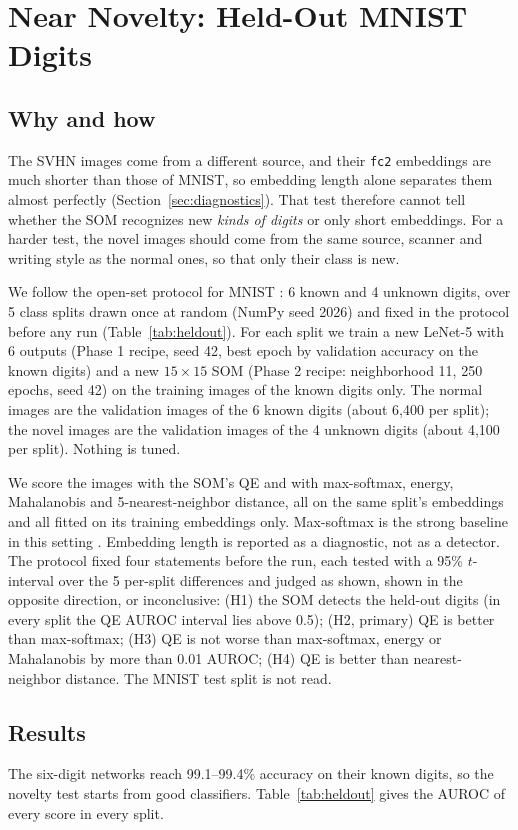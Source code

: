 \documentclass[11pt]{article}
\begin{document}
\section{Near Novelty: Held-Out MNIST Digits}\label{sec:heldout}
\subsection{Why and how}
The SVHN images come from a different source, and their \texttt{fc2} embeddings are much shorter than those of MNIST, so embedding length alone separates them almost perfectly (Section~\ref{sec:diagnostics}). That test therefore cannot tell whether the SOM recognizes new \emph{kinds of digits} or only short embeddings. For a harder test, the novel images should come from the same source, scanner and writing style as the normal ones, so that only their class is new.

We follow the open-set protocol for MNIST \parencite{neal2018open}: 6 known and 4 unknown digits, over 5 class splits drawn once at random (NumPy seed 2026) and fixed in the protocol before any run (Table~\ref{tab:heldout}). For each split we train a new LeNet-5 with 6 outputs (Phase 1 recipe, seed 42, best epoch by validation accuracy on the known digits) and a new $15\times15$ SOM (Phase 2 recipe: neighborhood 11, 250 epochs, seed 42) on the training images of the known digits only. The normal images are the validation images of the 6 known digits (about 6,400 per split); the novel images are the validation images of the 4 unknown digits (about 4,100 per split). Nothing is tuned.

We score the images with the SOM's QE and with max-softmax, energy, Mahalanobis and 5-nearest-neighbor distance, all on the same split's embeddings and all fitted on its training embeddings only. Max-softmax is the strong baseline in this setting \parencite{vaze2022openset}. Embedding length is reported as a diagnostic, not as a detector. The protocol fixed four statements before the run, each tested with a 95\% $t$-interval over the 5 per-split differences and judged as shown, shown in the opposite direction, or inconclusive: (H1) the SOM detects the held-out digits (in every split the QE AUROC interval lies above 0.5); (H2, primary) QE is better than max-softmax; (H3) QE is not worse than max-softmax, energy or Mahalanobis by more than 0.01 AUROC; (H4) QE is better than nearest-neighbor distance. The MNIST test split is not read.

\subsection{Results}
The six-digit networks reach 99.1--99.4\% accuracy on their known digits, so the novelty test starts from good classifiers. Table~\ref{tab:heldout} gives the AUROC of every score in every split.
\end{document}
